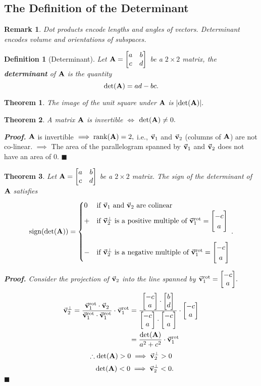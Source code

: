 \documentclass[12pt, a4paper]{article}
\newtheorem{thm}{Theorem}[subsection]
\newtheorem{df}{Definition}[subsection]
\newtheorem*{rmk}{\indent Remark}
\newenvironment*{prf}{\par\indent\textbf{\textit{Proof. }}}{\hfill $\blacksquare$\par}
\def\d{{\mathrm{d}}}
\def\rank{\mathrm{rank}}
\def\vecv{\va{v}}
\def\matrixA{\vb{A}}
\begin{document}
\subsection{The Definition of the Determinant}
\begin{rmk} Dot products encode lengths and angles of vectors. Determinant encodes volume and orientations of subspaces. \end{rmk}
\begin{df}[Determinant]
	Let $\matrixA=\mqty[{a&b\\c&d}]$ be a $2\times2$ matrix, the \textbf{determinant} of $\matrixA$ is the quantity \[\det(\matrixA)=ad-bc.\]	
\end{df}
\begin{thm}
	The image of the unit square under $\matrixA$ is $\qty|\det(\matrixA)|.$	
\end{thm}
\begin{thm}
	A matrix $\matrixA$ is invertible $\iff$ $\det(\matrixA)\neq0.$ 	
\end{thm}
\begin{prf}
	$\matrixA$ is invertible $\implies\rank(\matrixA)=2,$	i.e., $\vecv_1$ and $\vecv_2$ (columns of $\matrixA$) are not co-linear. $\implies$ The area of the parallelogram spanned by $\vecv_1$ and $\vecv_2$ does not have an area of $0$.
\end{prf}
\begin{thm}
	Let $\matrixA=\mqty[{a&b\\c&d}]$ be a $2\times2$ matrix. The sign of the determinant of $\matrixA$ satisfies \[\text{sign}(\det(\matrixA))=\begin{cases}0&\text{if }\vecv_1\text{ and }\vecv_2\text{ are colinear}\\+&\text{if }\vecv_2^\perp\text{ is a positive multiple of }\vecv_1^\text{rot}=\mqty[{-c\\a}]\\\\-&\text{if }\vecv_2^\perp\text{ is a negative multiple of }\vecv_1^\text{rot}=\mqty[{-c\\a}]\end{cases}.\]
	\begin{prf}
		Consider the projection of $\vecv_2$ into the line spanned by $\vecv_1^\text{rot}=\mqty[{-c\\a}].$ \[\begin{aligned}\vecv_2^\perp=\dfrac{\vecv_1^\text{rot}\cdot\vecv_2}{\vecv_1^\text{rot}\cdot\vecv_1^\text{rot}}\cdot\vecv_1^\text{rot}&=\dfrac{\mqty[{-c\\a}]\cdot\mqty[{b\\d}]}{\mqty[{-c\\a}]\cdot\mqty[{-c\\a}]}\cdot\mqty[{-c\\a}]\\&=\dfrac{\det(\matrixA)}{a^2+c^2}\cdot\vecv_1^\text{rot}\end{aligned}\] \[\therefore\det(\matrixA)>0\implies\vecv_2^\perp>0\]\[\quad\det(\matrixA)<0\implies\vecv_2^\perp<0.\]
	\end{prf}
\end{thm}
\end{document}

